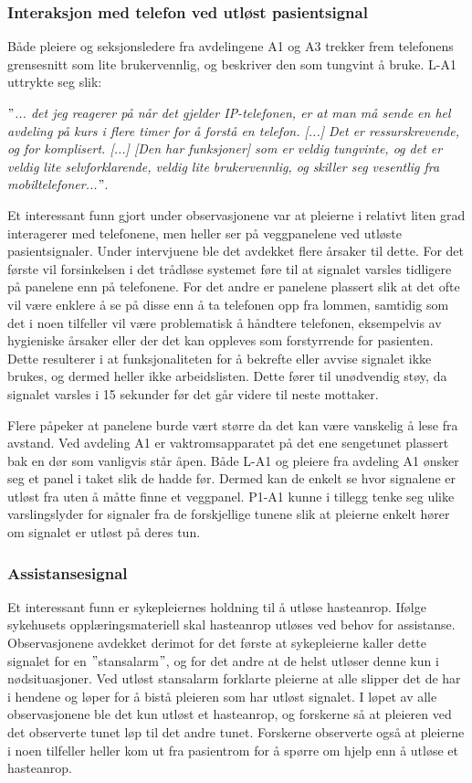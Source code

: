 \subsubsection{Interaksjon med telefon ved utløst pasientsignal}
Både pleiere og seksjonsledere fra avdelingene A1 og A3 trekker frem telefonens grensesnitt som lite brukervennlig, og beskriver den som tungvint å bruke. L-A1 uttrykte seg slik:

\noindent
\textit{ $"$... det jeg reagerer på når det gjelder IP-telefonen, er at man må sende en hel avdeling på kurs i flere timer for å forstå en telefon. [...] Det er ressurskrevende, og for komplisert. [...] [Den har funksjoner] som er veldig tungvinte, og det er veldig lite selvforklarende, veldig lite brukervennlig, og skiller seg vesentlig fra mobiltelefoner...$"$}.

\noindent
Et interessant funn gjort under observasjonene var at pleierne i relativt liten grad interagerer med telefonene, men heller ser på veggpanelene ved utløste pasientsignaler. Under intervjuene ble det avdekket flere årsaker til dette. For det første vil forsinkelsen i det trådløse systemet føre til at signalet varsles tidligere på panelene enn på telefonene. For det andre er panelene plassert slik at det ofte vil være enklere å se på disse enn å ta telefonen opp fra lommen, samtidig som det i noen tilfeller vil være problematisk å håndtere telefonen, eksempelvis av hygieniske årsaker eller der det kan oppleves som forstyrrende for pasienten. Dette resulterer i at funksjonaliteten for å bekrefte eller avvise signalet ikke brukes, og dermed heller ikke arbeidslisten. Dette fører til unødvendig støy, da signalet varsles i 15 sekunder før det går videre til neste mottaker. 

\noindent
Flere påpeker at panelene burde vært større da det kan være vanskelig å lese fra avstand. Ved avdeling A1 er vaktromsapparatet på det ene sengetunet plassert bak en dør som vanligvis står åpen. Både L-A1 og pleiere fra avdeling A1 ønsker seg et panel i taket slik de hadde før. Dermed kan de enkelt se hvor signalene er utløst fra uten å måtte finne et veggpanel. P1-A1 kunne i tillegg tenke seg ulike varslingslyder for signaler fra de forskjellige tunene slik at pleierne enkelt hører om signalet er utløst på deres tun.

\subsubsection{Assistansesignal}
Et interessant funn er sykepleiernes holdning til å utløse hasteanrop. Ifølge sykehusets opplæringsmateriell skal hasteanrop utløses ved behov for assistanse. Observasjonene avdekket derimot for det første at sykepleierne kaller dette signalet for en $"$stansalarm$"$, og for det andre at de helst utløser denne kun i nødsituasjoner. Ved utløst stansalarm forklarte pleierne at alle slipper det de har i hendene og løper for å bistå pleieren som har utløst signalet. I løpet av alle observasjonene ble det kun utløst et hasteanrop, og forskerne så at pleieren ved det observerte tunet løp til det andre tunet. Forskerne observerte også at pleierne i noen tilfeller heller kom ut fra pasientrom for å spørre om hjelp enn å utløse et hasteanrop. 

